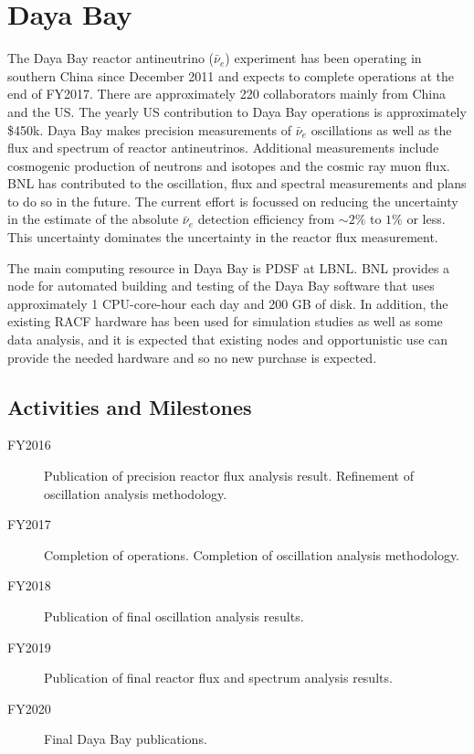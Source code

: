 \documentclass[pdftex,12pt,letter]{article}
\begin{document}
\pagebreak
\section{Daya Bay}

The Daya Bay reactor antineutrino ($\bar\nu_e$) experiment has been
operating in southern China since December 2011 and expects to
complete operations at the end of FY2017. There are approximately 220
collaborators mainly from China and the US. The yearly US contribution
to Daya Bay operations is approximately \$450k.
Daya Bay makes precision measurements of $\bar\nu_e$ oscillations as
well as the flux and spectrum of reactor antineutrinos. 
Additional measurements include cosmogenic production of neutrons and
isotopes and the cosmic ray muon flux. 
BNL has contributed to the oscillation, flux and spectral measurements
and plans to do so in the future. The current effort is focussed on
reducing the uncertainty in the estimate of the absolute $\bar\nu_e$
detection efficiency from $\sim\!2\%$ to $1\%$ or less. This
uncertainty dominates the uncertainty in the reactor flux measurement. 

The main computing resource in Daya Bay is PDSF at LBNL. BNL provides
a node for automated building and testing of the Daya Bay software
that uses approximately 1 CPU-core-hour each day and 200 GB of disk.
In addition, the existing RACF hardware has been used for simulation
studies as well as some data analysis, and 
it is expected that existing nodes and opportunistic use can provide
the needed hardware and so no new purchase is expected.


\subsection{Activities and Milestones}

\begin{description}
\item[FY2016] Publication of precision reactor flux analysis result. 
				Refinement of oscillation analysis methodology. 
\item[FY2017] Completion of operations. Completion of oscillation analysis methodology. 
\item[FY2018] Publication of final oscillation analysis results.
\item[FY2019] Publication of final reactor flux and spectrum analysis results.
\item[FY2020] Final Daya Bay publications.
\end{description}
\end{document}
